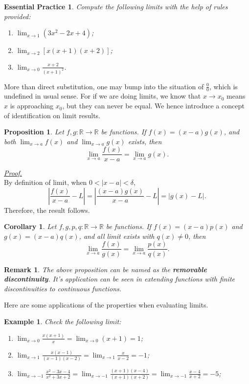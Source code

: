 \documentclass[12pt]{article}
\newtheorem*{corollary}{Corollary}
\newtheorem*{proposition}{Proposition}
\newtheorem*{remark}{Remark}
\newtheorem*{example}{Example}
\newtheorem{exercise}{Essential Practice}[section]
\renewenvironment{proof}[1][Proof]{\begin{snugshade*} \underline{\textit{{#1}.}}\\}{\hfill \qedsymbol \end{snugshade*}}
\begin{document}
    \begin{exercise}
        Compute the following limits with the help of rules provided:\begin{enumerate}
            \item $\displaystyle\lim_{x\to 1}(3x^2-2x+4)$;
            \item $\displaystyle\lim_{x\to 2}[x(x+1)(x+2)]$;
            \item $\displaystyle\lim_{x\to 0}\frac{x+2}{(x+1)^2}$.
        \end{enumerate}
    \end{exercise}

    More than direct substitution, one may bump into the situation of $\frac{0}{0}$, which is undefined in usual sense. For if we are doing limits, we know that $x\to x_0$ means $x$ is approaching $x_0$, but they can never be equal. We hence introduce a concept of identification on limit results.

    \begin{proposition}
        Let $f,g:\mathbb{R}\to\mathbb{R}$ be functions. If $f(x)=(x-a)g(x)$, and both $\lim_{x\to a} f(x)$ and $\lim_{x\to a}g(x)$ exists, then \[\lim_{x\to a}\frac{f(x)}{x-a}=\lim_{x\to a}g(x).\]
    \end{proposition}

    \begin{proof}
        By definition of limit, when $0<|x-a|<\delta$, \[|\frac{f(x)}{x-a}-L|=|\frac{(x-a)g(x)}{x-a}-L|=|g(x)-L|.\] Therefore, the result follows.
    \end{proof}

    \begin{corollary}
        Let $f,g,p,q:\mathbb{R}\to\mathbb{R}$ be functions. If $f(x)=(x-a)p(x)$ and $g(x)=(x-a)q(x)$, and all limit exists with $q(x)\neq 0$, then \[\lim_{x\to a}\frac{f(x)}{g(x)}=\lim_{x\to a}\frac{p(x)}{q(x)}.\]
    \end{corollary}

    \begin{remark}
        The above proposition can be named as the \textbf{removable discontinuity}. It's application can be seen in extending functions with finite discontinuities to continuous functions.
    \end{remark}

    Here are some applications of the properties when evaluating limits.

    \begin{example}
        Check the following limit:
        \begin{enumerate}
            \item $\displaystyle \lim_{x\to 0}\frac{x(x+1)}{x}=\lim_{x\to 0}(x+1)=1$;
            \item $\displaystyle \lim_{x\to 1}\frac{x(x-1)}{(x-1)(x-2)}=\lim_{x\to 1}\frac{x}{x-2}=-1$;
            \item $\displaystyle \lim_{x\to -1}\frac{x^2-3x-4}{x^2+3x+2}=\lim_{x\to -1}\frac{(x+1)(x-4)}{(x+1)(x+2)}=\lim_{x\to -1}\frac{x-4}{x+2}=-5$;
        \end{enumerate}
    \end{example}
\end{document}
